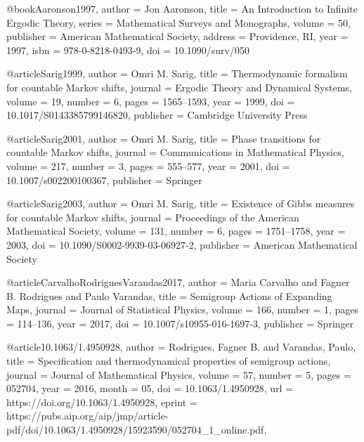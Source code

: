 @book{Aaronson1997,
  author    = {Jon Aaronson},
  title     = {An Introduction to Infinite Ergodic Theory},
  series    = {Mathematical Surveys and Monographs},
  volume    = {50},
  publisher = {American Mathematical Society},
  address   = {Providence, RI},
  year      = {1997},
  isbn      = {978-0-8218-0493-9},
  doi       = {10.1090/surv/050}
}


@article{Sarig1999,
  author    = {Omri M. Sarig},
  title     = {Thermodynamic formalism for countable Markov shifts},
  journal   = {Ergodic Theory and Dynamical Systems},
  volume    = {19},
  number    = {6},
  pages     = {1565--1593},
  year      = {1999},
  doi       = {10.1017/S0143385799146820},
  publisher = {Cambridge University Press}
}

@article{Sarig2001,
  author    = {Omri M. Sarig},
  title     = {Phase transitions for countable Markov shifts},
  journal   = {Communications in Mathematical Physics},
  volume    = {217},
  number    = {3},
  pages     = {555--577},
  year      = {2001},
  doi       = {10.1007/s002200100367},
  publisher = {Springer}
}

@article{Sarig2003,
  author    = {Omri M. Sarig},
  title     = {Existence of Gibbs measures for countable Markov shifts},
  journal   = {Proceedings of the American Mathematical Society},
  volume    = {131},
  number    = {6},
  pages     = {1751--1758},
  year      = {2003},
  doi       = {10.1090/S0002-9939-03-06927-2},
  publisher = {American Mathematical Society}
}



@article{CarvalhoRodriguesVarandas2017,
  author    = {Maria Carvalho and Fagner B. Rodrigues and Paulo Varandas},
  title     = {Semigroup Actions of Expanding Maps},
  journal   = {Journal of Statistical Physics},
  volume    = {166},
  number    = {1},
  pages     = {114--136},
  year      = {2017},
  doi       = {10.1007/s10955-016-1697-3},
  publisher = {Springer}
}


@article{10.1063/1.4950928,
    author = {Rodrigues, Fagner B. and Varandas, Paulo},
    title = {Specification and thermodynamical properties of semigroup actions},
    journal = {Journal of Mathematical Physics},
    volume = {57},
    number = {5},
    pages = {052704},
    year = {2016},
    month = {05},
         doi = {10.1063/1.4950928},
    url = {https://doi.org/10.1063/1.4950928},
    eprint = {https://pubs.aip.org/aip/jmp/article-pdf/doi/10.1063/1.4950928/15923590/052704_1_online.pdf},
}



